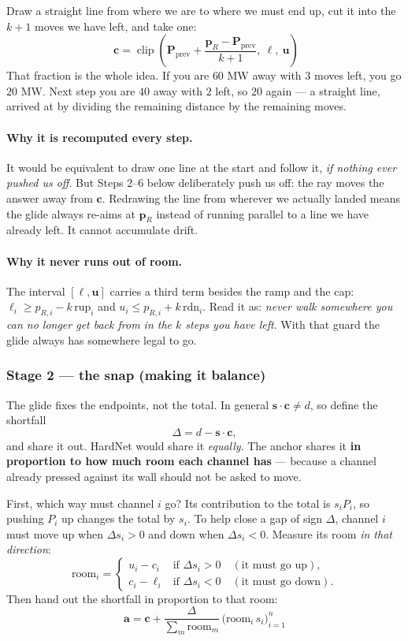 \documentclass[11pt]{article}
\begin{document}
Draw a straight line from where we are to where we must end up, cut it into the
$k+1$ moves we have left, and take one:
\[
\boxed{\;\mathbf{c} = \operatorname{clip}\!\left(\mathbf{P}_{\text{prev}}
 + \frac{\mathbf{p}_R - \mathbf{P}_{\text{prev}}}{k+1},\ \bm{\ell},\ \mathbf{u}\right)}
\]
That fraction is the whole idea. If you are $60$ MW away with $3$ moves left, you
go $20$ MW. Next step you are $40$ away with $2$ left, so $20$ again --- a straight
line, arrived at by dividing the remaining distance by the remaining moves.

\paragraph{Why it is recomputed every step.} It would be equivalent to draw one
line at the start and follow it, \emph{if nothing ever pushed us off}. But Steps
2--6 below deliberately push us off: the ray moves the answer away from
$\mathbf{c}$. Redrawing the line from wherever we actually landed means the glide
always re-aims at $\mathbf{p}_R$ instead of running parallel to a line we have
already left. It cannot accumulate drift.

\paragraph{Why it never runs out of room.} The interval $[\bm{\ell},\mathbf{u}]$
carries a third term besides the ramp and the cap:
$\ell_i \ge p_{R,i} - k\,\text{rup}_i$ and $u_i \le p_{R,i} + k\,\text{rdn}_i$.
Read it as: \emph{never walk somewhere you can no longer get back from in the
$k$ steps you have left}. With that guard the glide always has somewhere legal to
go.

\subsubsection*{Stage 2 --- the snap (making it balance)}

The glide fixes the endpoints, not the total. In general
$\mathbf{s}\cdot\mathbf{c}\ne d$, so define the shortfall
\[
\Delta = d - \mathbf{s}\cdot\mathbf{c},
\]
and share it out. HardNet would share it \emph{equally}. The anchor shares it
\textbf{in proportion to how much room each channel has} --- because a channel
already pressed against its wall should not be asked to move.

First, which way must channel $i$ go? Its contribution to the total is $s_iP_i$,
so pushing $P_i$ up changes the total by $s_i$. To help close a gap of sign
$\Delta$, channel $i$ must move up when $\Delta s_i > 0$ and down when
$\Delta s_i < 0$. Measure its room \emph{in that direction}:
\[
\text{room}_i =
\begin{cases}
u_i - c_i & \text{if } \Delta s_i > 0 \quad(\text{it must go up}),\\[2pt]
c_i - \ell_i & \text{if } \Delta s_i < 0 \quad(\text{it must go down}).
\end{cases}
\]
Then hand out the shortfall in proportion to that room:
\[
\boxed{\;\mathbf{a} = \mathbf{c}
 + \frac{\Delta}{\sum_m \text{room}_m}\,\bigl(\text{room}_i\, s_i\bigr)_{i=1}^{n}\;}
\]
\end{document}
